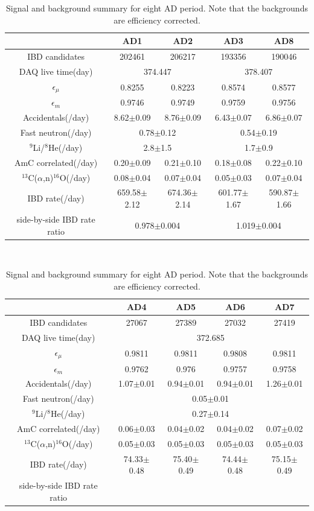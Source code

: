 \begin{table}
	\centering
	\begin{tabular}{c|cc|cc}
		\hline
		\hline
    & AD1 & AD2 & AD3 & AD8 \\
    \hline
		IBD candidates & 202461 & 206217 & 193356 & 190046 \\
		DAQ live time(day) & \multicolumn{2}{c|}{374.447} & \multicolumn{2}{c}{378.407} \\
		$\epsilon_\mu$ & 0.8255 & 0.8223 & 0.8574 & 0.8577 \\
		$\epsilon_m$ & 0.9746 & 0.9749 & 0.9759 & 0.9756 \\
		Accidentals(/day) & 8.62$\pm$0.09 & 8.76$\pm$0.09 & 6.43$\pm$0.07 & 6.86$\pm$0.07 \\
		Fast neutron(/day) & \multicolumn{2}{c|}{0.78$\pm$0.12} & \multicolumn{2}{c}{0.54$\pm$0.19} \\
		$^9$Li/$^8$He(/day) & \multicolumn{2}{c|}{2.8$\pm$1.5} & \multicolumn{2}{c}{1.7$\pm$0.9} \\
		AmC correlated(/day) & 0.20$\pm$0.09 & 0.21$\pm$0.10 & 0.18$\pm$0.08 & 0.22$\pm$0.10 \\
		$^{13}$C($\alpha$,n)$^{16}$O(/day) & 0.08$\pm$0.04 & 0.07$\pm$0.04 & 0.05$\pm$0.03 & 0.07$\pm$0.04 \\
		\hline
		IBD rate(/day) & 659.58$\pm$2.12 & 674.36$\pm$2.14 & 601.77$\pm$1.67 & 590.87$\pm$1.66 \\
		\hline
		side-by-side IBD rate ratio & \multicolumn{2}{c|}{0.978$\pm$0.004} & \multicolumn{2}{c}{1.019$\pm$0.004} \\
		\hline
		\hline
	\end{tabular}\\
	\begin{tabular}{c|cccc}
		\hline
		\hline
		& AD4 & AD5 & AD6 & AD7 \\
    \hline
		IBD candidates & 27067 & 27389 & 27032 & 27419 \\
		DAQ live time(day) & \multicolumn{4}{c}{372.685} \\
		$\epsilon_\mu$ & 0.9811 & 0.9811 & 0.9808 & 0.9811 \\
		$\epsilon_m$ & 0.9762 & 0.976 & 0.9757 & 0.9758 \\
		Accidentals(/day) & 1.07$\pm$0.01 & 0.94$\pm$0.01 & 0.94$\pm$0.01 & 1.26$\pm$0.01 \\
		Fast neutron(/day) & \multicolumn{4}{c}{0.05$\pm$0.01} \\
		$^9$Li/$^8$He(/day) & \multicolumn{4}{c}{0.27$\pm$0.14} \\
		AmC correlated(/day) & 0.06$\pm$0.03 & 0.04$\pm$0.02 & 0.04$\pm$0.02 & 0.07$\pm$0.02 \\
		$^{13}$C($\alpha$,n)$^{16}$O(/day) & 0.05$\pm$0.03 & 0.05$\pm$0.03 & 0.05$\pm$0.03 & 0.05$\pm$0.03 \\
		\hline
		IBD rate(/day) & 74.33$\pm$0.48 & 75.40$\pm$0.49 & 74.44$\pm$0.48 & 75.15$\pm$0.49 \\
		\hline
		side-by-side IBD rate ratio & \multicolumn{4}{c}{} \\
		\hline
		\hline
	\end{tabular}
	\caption{Signal and background summary for eight AD period. Note that the backgrounds are efficiency corrected.}
	\label{table:IBD_summary}
\end{table}
